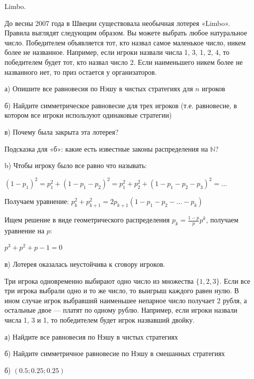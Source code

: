 \begin{problem}
Limbo.

До весны 2007 года в Швеции существовала необычная лотерея «Limbo». Правила выглядят следующим образом. Вы можете выбрать любое натуральное число. Победителем объявляется тот, кто назвал самое маленькое число, никем более не названное. Например, если игроки назвали числа 1, 3, 1, 2, 4, то победителем будет тот, кто назвал число 2. Если наименьшего никем более не названного нет, то приз остается у организаторов. \par
а) Опишите все равновесия по Нэшу в чистых стратегиях для $n$ игроков \par
б) Найдите симметрическое равновесие для трех игроков (т.е. равновесие, в котором все игроки используют одинаковые стратегии) \par
в) Почему была закрыта эта лотерея? \par
Подсказка для «б»: какие есть известные законы распределения на $\mathbb{N}$?



\begin{sol}

b)
Чтобы игроку было все равно что называть:

$(1-p_1)^2 = p_1^2+(1-p_1-p_2)^2 = p_1^2+p_2^2+(1-p_1-p_2-p_3)^2 =\ldots $

Получаем уравнение:
$p_{k}^{2}+p_{k+1}^{2}=2p_{k+1}(1-p_{1}-p_{2}-\ldots -p_{k})$

Ищем решение в виде геометрического распределения $p_{k}=\frac{1-p}{p}p^{k}$, получаем уравнение на $p$:\par
$p^{3}+p^{2}+p-1=0$ \par
в) Лотерея оказалась неустойчива к сговору игроков.
\end{sol}
\end{problem}



\begin{problem}

Три игрока одновременно выбирают одно число из множества $\{1,2,3\}$. Если все три игрока выбрали одно и то же число, то выигрыш каждого равен нулю. В ином случае игрок выбравший наименьшее непарное число получает 2 рубля, а остальные двое — платят по одному рублю. Например, если игроки назвали числа 1, 3 и 1, то победителем будет игрок назвавший двойку. \par
а) Найдите все равновесия по Нэшу в чистых стратегиях \par
б) Найдите симметричное равновесие по Нэшу в смешанных стратегиях



\begin{sol}
б) $(0.5;0.25;0.25)$
\end{sol}
\end{problem}



